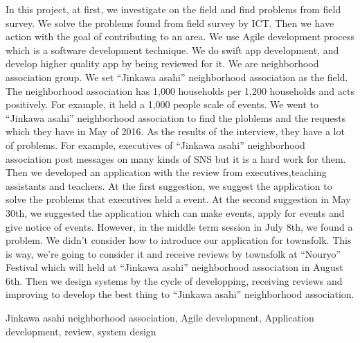 \begin{eabstract}
In this project, at first, we investigate on the field and find problems from field survey. We solve the problems found from field survey by ICT. Then we have action with the goal of contributing to an area. We use Agile development process which is a software development technique. We do swift app development, and develop higher quality app by being reviewed for it.
We are neighborhood association group. We set ``Jinkawa asahi'' neighborhood association as the field.
The neighborhood association has 1,000 households per 1,200 households and acts positively. For example, it held a 1,000 people scale of events. We went to ``Jinkawa asahi'' neighborhood association to find the ploblems and the requests which they have in May of 2016. As the results of the interview, they have a lot of problems. For example, executives of ``Jinkawa asahi'' neighborhood association post messages on many kinds of SNS but it is a hard work for them. Then we developed an application with the review from executives,teaching assistants and teachers. At the first suggestion, we suggest the application to solve the problems that executives held a event. At the second suggestion in May 30th, we suggested the application which can make events, apply for events and give notice of events. However, in the middle term session in July 8th, we found a problem. We didn't consider how to introduce our application for townsfolk. This is way, we're going to consider it and receive reviews by townsfolk at ``Nouryo'' Festival which will held at ``Jinkawa asahi'' neighborhood association in August 6th. Then we design systems by the cycle of developping, receiving reviews and improving to develop the best thing to ``Jinkawa asahi'' neighborhood association.
\begin{ekeyword}
Jinkawa asahi neighborhood association, Agile development, Application development, review, system design
\end{ekeyword}
\end{eabstract}
